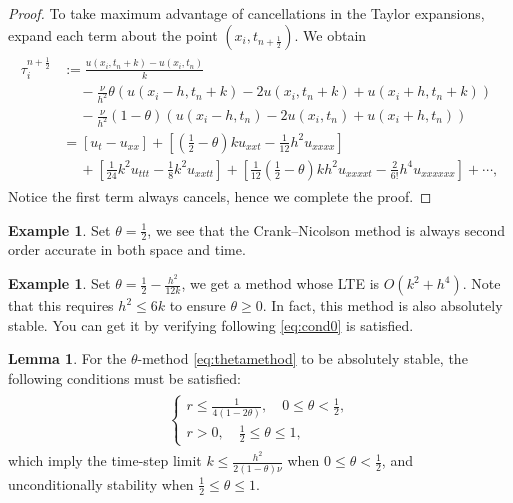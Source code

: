 \documentclass[a4paper,twoside]{ctexart}
\theoremstyle{definition}
\newtheorem{example}[definition]{Example}
\newtheorem{lemma}[definition]{Lemma}
\begin{document}
\begin{proof}
	 To take maximum advantage of cancellations in the Taylor expansions, expand each term about the
	 point $(x_i , t_{n+\frac{1}{2}})$. We obtain
	 \begin{eqnarray}
	 \label{eq:LTEres}
	 \begin{aligned}
	 \tau_i^{n+\frac{1}{2}} &:= \frac{u(x_i,t_n+k) - u(x_i,t_n)}{k} \\
	 &\quad \ -\frac{\nu}{h^2}\theta(u(x_i-h,t_n+k)-2u(x_i,t_n+k)+u(x_i+h,t_n+k))\\
	 &\quad \ -\frac{\nu}{h^2}(1-\theta)(u(x_i-h,t_n)-2u(x_i,t_n)+u(x_i+h,t_n))\\
	 &=\left[u_t - u_{xx}\right] + \left[\left(\frac{1}{2}-\theta\right)ku_{xxt}-\frac{1}{12}h^2u_{xxxx}\right]\\
	 &\quad \
	 +\left[\frac{1}{24}k^2u_{ttt}-\frac{1}{8}k^2u_{xxtt}\right]+\left[\frac{1}{12}\left(\frac{1}{2}-\theta\right)kh^2u_{xxxxt}-\frac{2}{6!}h^4u_{xxxxxx}\right]+\cdots,
	 \end{aligned}
	 \end{eqnarray}
	 Notice the first term always cancels, hence we complete the proof.
\end{proof}
\begin{example}
	Set $\theta = \frac{1}{2}$, we see that the Crank–Nicolson method is always second order accurate
	in both space and time.
\end{example}
\begin{example}
	Set $\theta = \frac{1}{2} - \frac{h^2}{12k}$, we get a method whose LTE is $O(k^2+h^4)$. Note that this requires $h^2 \le 6k$ to ensure $\theta \ge 0$. In fact, this method is also absolutely stable. You can get it by verifying following \eqref{eq:cond0} is satisfied.
\end{example}
\begin{lemma}
	\label{le:stableoftheta}
	For the $\theta$-method \eqref{eq:thetamethod} to be absolutely stable, the following conditions must be satisfied:
	\begin{eqnarray}
	\label{eq:cond0}
	\begin{aligned}
	\begin{cases}
	r \le \frac{1}{4(1-2\theta)} , \quad 0 \le \theta < \frac{1}{2}, \\
	r > 0, \quad \frac{1}{2} \le \theta \le 1, 
	\end{cases}
	\end{aligned}
	\end{eqnarray}
	which imply the time-step limit $k \le \frac{h^2}{2(1-\theta)\nu}$ when $0 \le \theta < \frac{1}{2}$, and unconditionally stability when $\frac{1}{2} \le \theta \le 1$.
\end{lemma}
\end{document}
